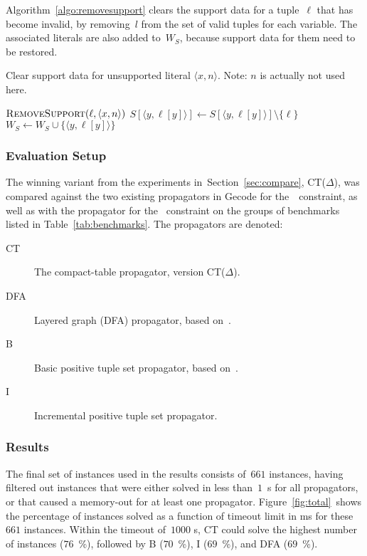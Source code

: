 \documentclass[a4paper,11pt]{article}
\newcommand{\Secref}[1]{Section~\ref{#1}}
\newcommand{\Algoref}[1]{Algorithm~\ref{#1}}
\newcommand{\Table}{\Constraint{Table}}
\newcommand{\Regular}{\Constraint{Regular}}
\newcommand{\FOREACH}[1]{\FORALL{{#1} \textbf{do}}}
\newcommand{\ENDFOREACH}{\ENDFOR}
\def\PROCEDURE{\item[\textbf{PROCEDURE}]}
\def\RemoveSupport{\textsc{RemoveSupport}}
\numberwithin{equation}{section}
\begin{document}
\begin{description}
\Algoref{algo:removesupport} clears the support data for a tuple~$\ell$ that has
become invalid, by removing~$l$ from the set of valid tuples for each variable.
The associated literals are also added to~$W_S$, because support data for them
need to be restored.
 
\begin{algorithm}
\caption{Clear support data for unsupported literal $\langle x,n
  \rangle$.  Note: $n$ is actually not used here.}
  \label{algo:removesupport}
\begin{algorithmic}[1]
  \PROCEDURE $\RemoveSupport(\ell, \langle x,n \rangle)$
  \FOREACH{$y \in X$}
    \STATE $S[\langle y,\ell[y] \rangle] \gets S[\langle y,\ell[y] \rangle] \setminus \{ \ell \}$
      \STATE $W_S \gets W_S \cup \{ \langle y,\ell[y] \rangle \}$
    \ENDIF
  \ENDFOREACH
\end{algorithmic}
\end{algorithm}

   \end{description}
\clearpage
\subsubsection{Evaluation Setup}
The winning variant from the experiments in~\Secref{sec:compare},
CT($\Delta$), was compared against the two existing propagators
in Gecode for the~\Table~constraint, as well as with the propagator
for the \Regular~constraint on the groups of benchmarks
listed in Table~\ref{tab:benchmarks}. The propagators are
denoted:

\begin{description}
  \item[CT] The compact-table propagator, version CT($\Delta$).
  \item[DFA] Layered graph (DFA) propagator, based on~\cite{Pesant:seqs}.
  \item[B] Basic positive tuple set propagator, based on~\cite{DBLP:journals/ai/BessiereRYZ05}.
  \item[I] Incremental positive tuple set propagator.
\end{description}

\subsubsection{Results}

The final set of instances used in the results consists of~$661$ instances,
having filtered out instances that were either solved in less than~$1$~s for all
propagators, or that caused a memory-out for at least one propagator.
Figure~\ref{fig:total}~shows the percentage of instances solved as a function
of timeout limit in ms for these~$661$ instances. Within the timeout of~$1000$ s,
CT could solve the highest number of instances ($76$~\%), followed by B ($70$~\%),
I ($69$~\%), and DFA ($69$~\%).
\end{document}
